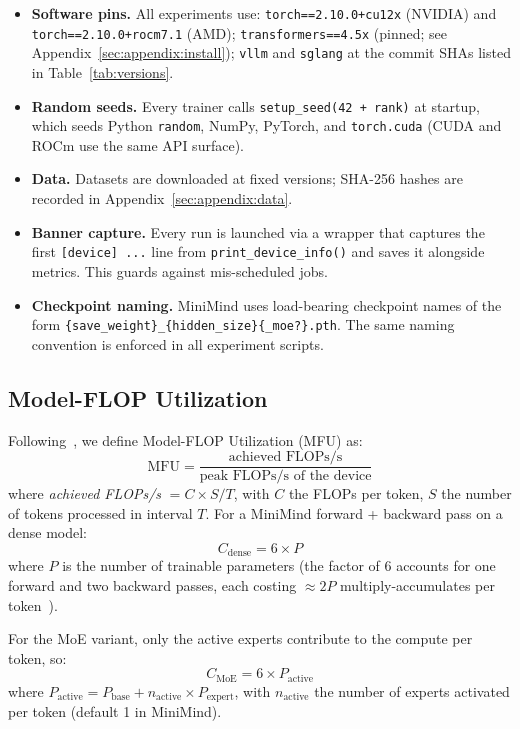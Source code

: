 \begin{itemize}[leftmargin=*]
  \item \textbf{Software pins.}  All experiments use:
    \texttt{torch==2.10.0+cu12x} (NVIDIA) and
    \texttt{torch==2.10.0+rocm7.1} (AMD);
    \texttt{transformers==4.5x} (pinned; see Appendix~\ref{sec:appendix:install});
    \texttt{vllm} and \texttt{sglang} at the commit SHAs listed in
    Table~\ref{tab:versions}.
  \item \textbf{Random seeds.}  Every trainer calls
    \texttt{setup\_seed(42 + rank)} at startup, which seeds Python
    \texttt{random}, NumPy, PyTorch, and \texttt{torch.cuda} (CUDA and ROCm
    use the same API surface).
  \item \textbf{Data.}  Datasets are downloaded at fixed versions; SHA-256
    hashes are recorded in Appendix~\ref{sec:appendix:data}.
  \item \textbf{Banner capture.}  Every run is launched via a wrapper that
    captures the first \texttt{[device] ...} line from
    \texttt{print\_device\_info()} and saves it alongside metrics.  This guards
    against mis-scheduled jobs.
  \item \textbf{Checkpoint naming.}  MiniMind uses load-bearing checkpoint
    names of the form
    \texttt{\{save\_weight\}\_\{hidden\_size\}\{\_moe?\}.pth}.
    The same naming convention is enforced in all experiment scripts.
\end{itemize}

\subsection{Model-FLOP Utilization}
\label{sec:methodology:mfu}

Following~\citet{chowdhery2023palm}, we define Model-FLOP Utilization (MFU) as:
\[
  \text{MFU} = \frac{\text{achieved FLOPs/s}}{\text{peak FLOPs/s of the device}}
\]
where \emph{achieved FLOPs/s} $= C \times S / T$,
with $C$ the FLOPs per token, $S$ the number of tokens processed in interval
$T$.  For a MiniMind forward + backward pass on a dense model:
\[
  C_{\text{dense}} = 6 \times P
\]
where $P$ is the number of trainable parameters (the factor of 6 accounts for
one forward and two backward passes, each costing $\approx 2P$
multiply-accumulates per token~\citep{chowdhery2023palm}).

For the MoE variant, only the active experts contribute to the compute per
token, so:
\[
  C_{\text{MoE}} = 6 \times P_{\text{active}}
\]
where $P_{\text{active}} = P_{\text{base}} + n_{\text{active}} \times
P_{\text{expert}}$, with $n_{\text{active}}$ the number of experts activated
per token (default 1 in MiniMind).

